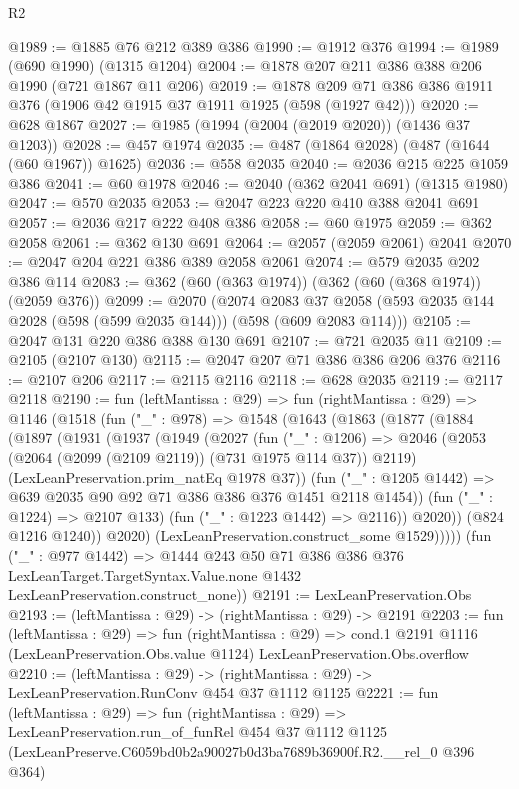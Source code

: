 \begin{lexlean}{R2}
\begin{coremodule}
@1989 := @1885 @76 @212 @389 @386
@1990 := @1912 @376
@1994 := @1989 (@690 @1990) (@1315 @1204)
@2004 := @1878 @207 @211 @386 @388 @206 @1990 (@721 @1867 @11 @206)
@2019 := @1878 @209 @71 @386 @386 @1911 @376 (@1906 @42 @1915 @37 @1911 @1925 (@598 (@1927 @42)))
@2020 := @628 @1867
@2027 := @1985 (@1994 (@2004 (@2019 @2020)) (@1436 @37 @1203))
@2028 := @457 @1974
@2035 := @487 (@1864 @2028) (@487 (@1644 (@60 @1967)) @1625)
@2036 := @558 @2035
@2040 := @2036 @215 @225 @1059 @386
@2041 := @60 @1978
@2046 := @2040 (@362 @2041 @691) (@1315 @1980)
@2047 := @570 @2035
@2053 := @2047 @223 @220 @410 @388 @2041 @691
@2057 := @2036 @217 @222 @408 @386
@2058 := @60 @1975
@2059 := @362 @2058
@2061 := @362 @130 @691
@2064 := @2057 (@2059 @2061) @2041
@2070 := @2047 @204 @221 @386 @389 @2058 @2061
@2074 := @579 @2035 @202 @386 @114
@2083 := @362 (@60 (@363 @1974)) (@362 (@60 (@368 @1974)) (@2059 @376))
@2099 := @2070
    (@2074
      @2083
      @37
      @2058
      (@593 @2035 @144 @2028 (@598 (@599 @2035 @144)))
      (@598 (@609 @2083 @114)))
@2105 := @2047 @131 @220 @386 @388 @130 @691
@2107 := @721 @2035 @11
@2109 := @2105 (@2107 @130)
@2115 := @2047 @207 @71 @386 @386 @206 @376
@2116 := @2107 @206
@2117 := @2115 @2116
@2118 := @628 @2035
@2119 := @2117 @2118
@2190 := fun (leftMantissa : @29) =>
  fun (rightMantissa : @29) =>
  @1146
    (@1518
      (fun ("_" : @978) =>
      @1548
        (@1643
          (@1863
            (@1877
              (@1884
                (@1897
                  (@1931
                    (@1937
                      (@1949
                        (@2027
                          (fun ("_" : @1206) =>
                          @2046
                            (@2053 (@2064 (@2099 (@2109 @2119)) (@731 @1975 @114 @37)) @2119)
                            (LexLeanPreservation.prim_natEq @1978 @37))
                          (fun ("_" : @1205 @1442) =>
                          @639 @2035 @90 @92 @71 @386 @386 @376 @1451 @2118 @1454))
                        (fun ("_" : @1224) => @2107 @133)
                        (fun ("_" : @1223 @1442) => @2116))
                      @2020))
                  (@824 @1216 @1240))
                @2020)
              (LexLeanPreservation.construct_some @1529)))))
      (fun ("_" : @977 @1442) =>
      @1444
        @243
        @50
        @71
        @386
        @386
        @376
        LexLeanTarget.TargetSyntax.Value.none
        @1432
        LexLeanPreservation.construct_none))
@2191 := LexLeanPreservation.Obs
@2193 := (leftMantissa : @29) -> (rightMantissa : @29) -> @2191
@2203 := fun (leftMantissa : @29) =>
  fun (rightMantissa : @29) =>
  cond.{1} @2191 @1116 (LexLeanPreservation.Obs.value @1124) LexLeanPreservation.Obs.overflow
@2210 := (leftMantissa : @29) ->
  (rightMantissa : @29) -> LexLeanPreservation.RunConv @454 @37 @1112 @1125
@2221 := fun (leftMantissa : @29) =>
  fun (rightMantissa : @29) =>
  LexLeanPreservation.run_of_funRel
    @454
    @37
    @1112
    @1125
    (LexLeanPreserve.C6059bd0b2a90027b0d3ba7689b36900f.R2.__rel_0 @396 @364)
\end{coremodule}
\end{lexlean}
